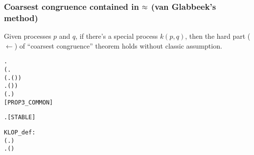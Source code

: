 \begin{frame}
\frametitle{Coarsest congruence contained in $\approx$ (van Glabbeek's method)}
\begin{scriptsize}
\begin{lemma}
Given processes $p$ and $q$, if there's a special process $k(p,q)$,
then the hard part ($\leftarrow$) of ``coarsest congruence'' theorem
holds without classic assumption.
\begin{alltt}
\HOLTokenTurnstile{} \HOLSymConst{\HOLTokenForall{}} .
       (\HOLSymConst{\HOLTokenExists{}}.
              \HOLSymConst{\HOLTokenConj{}} (\HOLSymConst{\HOLTokenForall{}} .  \HOLTokenWeakTransBegin{}\HOLTokenWeakTransEnd {} \HOLSymConst{\HOLTokenImp{}} \HOLSymConst{\HOLTokenNeg{}}( \HOLSymConst{\HOLTokenWeakEQ} )) \HOLSymConst{\HOLTokenConj{}}
            \HOLSymConst{\HOLTokenForall{}} .  \HOLTokenWeakTransBegin{}\HOLTokenWeakTransEnd {} \HOLSymConst{\HOLTokenImp{}} \HOLSymConst{\HOLTokenNeg{}}( \HOLSymConst{\HOLTokenWeakEQ} )) \HOLSymConst{\HOLTokenImp{}}
       (\HOLSymConst{\HOLTokenForall{}}.  \HOLSymConst{\ensuremath{+}}  \HOLSymConst{\HOLTokenWeakEQ}  \HOLSymConst{\ensuremath{+}} ) \HOLSymConst{\HOLTokenImp{}}
        \HOLSymConst{\HOLTokenObsCongr} \hfill{[PROP3_COMMON]}
\end{alltt}
\begin{alltt}
  \HOLSymConst{\HOLTokenEquiv{}} \HOLSymConst{\HOLTokenForall{}} .  \HOLTokenTransBegin{}\HOLTokenTransEnd {} \HOLSymConst{\HOLTokenImp{}}  \HOLSymConst{\HOLTokenNotEqual{}} \HOLSymConst{\ensuremath{\tau}}\hfill{[STABLE]}
\end{alltt}
\end{lemma}
\begin{definition}
\begin{alltt}
KLOP_def:\\
\HOLTokenTurnstile{} (\HOLSymConst{\HOLTokenForall{}}.    \HOLSymConst{=} ) \HOLSymConst{\HOLTokenConj{}}
   \HOLSymConst{\HOLTokenForall{}} .   ( ) \HOLSymConst{=}    \HOLSymConst{\ensuremath{+}}    


\end{alltt}
\end{definition}
\end{scriptsize}
\end{frame}
